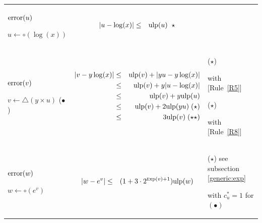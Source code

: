 \documentclass[12pt]{amsart}
\def\pinf{\bigtriangleup}
\def\ulp{{\rm ulp}}
\def\Exp{{\rm \textsc exp}}
\newcommand{\U}[1]{\quad \mbox{[Rule~\ref{#1}]}}
\begin{document}
\begin{center}
\begin{tabular}{l l l}

\begin{minipage}{2.5cm}


${\textnormal{error}}(u)$


$u \leftarrow \circ(\log(x))$

\end{minipage} &
\begin{minipage}{7.5cm}

\begin{eqnarray}\nonumber
  |u-\log(x)| &\leq& \ulp(u)\;\;\star
\end{eqnarray}

\end{minipage} &
\begin{minipage}{6cm}

\end{minipage}\\%
\begin{minipage}{2.5cm}
${\textnormal{error}}(v)$


$v \leftarrow \pinf(y \times u) $
($\bullet$)
\end{minipage} &
\begin{minipage}{7.5cm}

\begin{eqnarray}\nonumber
  |v-y\log(x)| &\leq& \ulp(v) + |y u-y \log(x)|\\\nonumber
   &\leq& \ulp(v) + y|u-\log(x)|\\\nonumber
   &\leq& \ulp(v) + y \ulp(u)\\\nonumber
   &\leq& \ulp(v) + 2 \ulp(yu) \;(\star)\\\nonumber
   &\leq& 3 \ulp(v)  \;(\star\star)
\end{eqnarray}


\end{minipage} &
\begin{minipage}{6cm}
($\star$)

with \U{R5}

($\star$)

with \U{R8}

\end{minipage}\\%
\begin{minipage}{2.5cm}
${\textnormal{error}}(w)$


$w \leftarrow \circ(e^v) $

\end{minipage} &
\begin{minipage}{7.5cm}
\begin{eqnarray}\nonumber
  |w-e^v| &\leq& (1+3 \cdot 2^{\Exp(v)+1}) \ulp(w)
\end{eqnarray}
\end{minipage} &
\begin{minipage}{6cm}
($\star$)
see subsection \ref{generic:exp}

with $c_u^* = 1$ for $(\bullet)$
\end{minipage}
\end{tabular}
\end{center}
\end{document}
